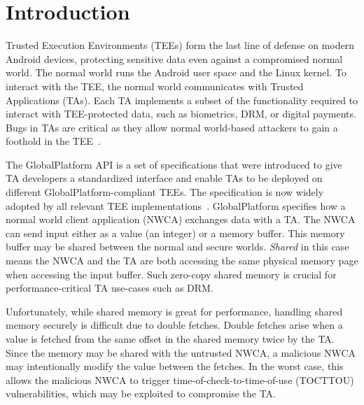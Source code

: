 \documentclass[conference]{IEEEtran}
\begin{document}
\section{Introduction}\label{sec:introduction}

Trusted Execution Environments (TEEs) form the last line of defense on modern Android devices, protecting 
sensitive data even against a compromised normal world. The normal world 
runs the Android user space and the Linux kernel.  
To interact with the TEE, the normal world communicates with 
Trusted Applications (TAs). Each TA implements a subset of the functionality 
required to interact with TEE-protected data, such as biometrics, DRM, or digital payments. Bugs in TAs 
are critical as they allow normal world-based attackers to gain a foothold in the TEE~\cite{beniaini2017trustissues,berard2018kinibi,busch2020finding,rollback,globalconfusion,Komaromy2021UnboxYourPhone,Li2024DiveIntoAndroidTA,AdamskiGuilbonPeterlin2019SamsungTrustZone,Makkaveev2019TrustZoneFuzzing,AdamTC}.

The GlobalPlatform API is a set of specifications that were introduced to 
give TA developers a standardized interface and enable TAs to be deployed on 
different GlobalPlatform-compliant TEEs. The specification is now widely adopted by all  
relevant TEE implementations~\cite{globalconfusion}. GlobalPlatform specifies how a normal 
world client application (NWCA) exchanges data with a TA. The NWCA can send input either as a value (an 
integer) or a memory buffer. This memory buffer may be shared between the 
normal and secure worlds. \textit{Shared} in this case means the NWCA and the TA are both 
accessing the same physical memory page when accessing the input buffer. Such zero-copy 
shared memory is crucial for performance-critical TA use-cases such as DRM.

Unfortunately, while shared memory is great for performance, handling shared 
memory securely is difficult due to double fetches. Double fetches arise when 
a value is fetched from the same offset in the shared memory twice by the TA. 
Since the memory may be shared with the untrusted NWCA, a malicious NWCA may intentionally 
modify the value between the fetches. 
In the worst case, this allows the malicious NWCA to trigger time-of-check-to-time-of-use (TOCTTOU) 
vulnerabilities, which may be exploited to compromise the TA.
\end{document}
